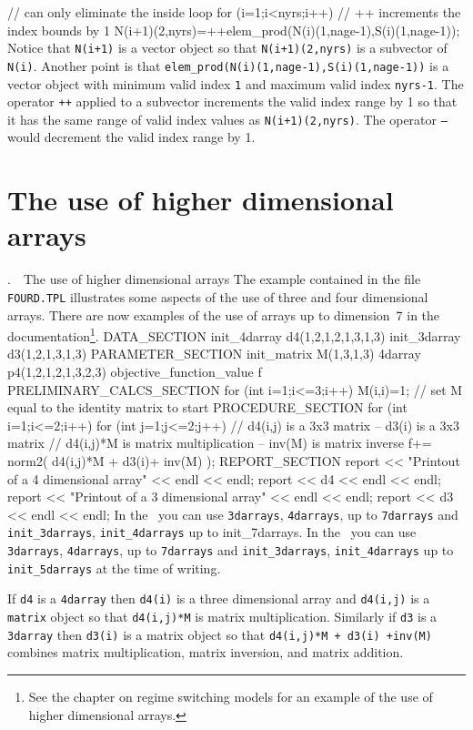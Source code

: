 \documentclass[12pt]{book}
\makeatletter
\def\mysection#1{\section{#1}{\bigbf \medbreak\noindent\number\c@chapter.\number\c@section\ \ #1\medbreak}}
\makeatother
\begin{document}
  // can only eliminate the inside loop
  for (i=1;i<nyrs;i++)
  {
    // ++ increments the index bounds by 1
    N(i+1)(2,nyrs)=++elem_prod(N(i)(1,nage-1),S(i)(1,nage-1));
  }
\endexample
\noindent Notice that {\tt N(i+1)} is a vector object so that
{\tt N(i+1)(2,nyrs)} is a subvector of {\tt N(i)}. Another
point is that {\tt elem\_prod(N(i)(1,nage-1),S(i)(1,nage-1))}
is a vector object with minimum valid index {\tt 1} and maximum valid
index {\tt nyrs-1}. The operator {\tt ++} applied to a subvector
increments the valid index range by 1 so that it has the same
range of valid index values as {\tt N(i+1)(2,nyrs)}.
The operator {\tt --} would decrement the valid index range by 1.
\mysection{The use of higher dimensional arrays}
The example contained in the file
{\tt FOURD.TPL} illustrates some aspects of the use of three and four
dimensional arrays. There are now examples of the use of arrays
up to dimension~7 in the documentation\footnote{See the chapter on
regime switching models for an example of the use of higher dimensional arrays.}.
\beginexample 
DATA_SECTION
  init_4darray d4(1,2,1,2,1,3,1,3)
  init_3darray d3(1,2,1,3,1,3)
PARAMETER_SECTION
  init_matrix M(1,3,1,3) 
  4darray p4(1,2,1,2,1,3,2,3)
  objective_function_value f
PRELIMINARY_CALCS_SECTION
 for (int i=1;i<=3;i++)
 {
   M(i,i)=1;   // set M equal to the identity matrix to start
 } 
PROCEDURE_SECTION
 for (int i=1;i<=2;i++)
 {
   for (int j=1;j<=2;j++)
   {
     // d4(i,j) is a 3x3 matrix -- d3(i) is a 3x3 matrix 
     // d4(i,j)*M is matrix multiplication -- inv(M) is matrix inverse
     f+= norm2( d4(i,j)*M + d3(i)+ inv(M) );
   }
 }
REPORT_SECTION
  report << "Printout of a 4 dimensional array" << endl << endl;
  report << d4 << endl << endl;
  report << "Printout of a 3 dimensional array" << endl << endl;
  report << d3 << endl << endl;
\endexample
\noindent In the \DS\ you can use {\tt 3darrays}, {\tt 4darrays},
up to {\tt 7darrays} and
{\tt init\_3darrays}, {\tt init\_4darrays} up to {init\_7darrays}.
In the \PS\ you can use {\tt 3darrays}, {\tt 4darrays}, up to {\tt 7darrays}
and  {\tt init\_3darrays}, {\tt init\_4darrays} up to {\tt init\_5darrays}
at the time of writing. 

If {\tt d4} is a {\tt 4darray} then 
{\tt d4(i)} is a three dimensional array and {\tt d4(i,j)} is a {\tt matrix}
object so that {\tt d4(i,j)*M} is matrix multiplication. Similarly
if {\tt d3} is a {\tt 3darray} then {\tt d3(i)} is a matrix object
so that {\tt d4(i,j)*M + d3(i) +inv(M)} combines matrix multiplication,
matrix inversion, and matrix addition.
\end{document}
